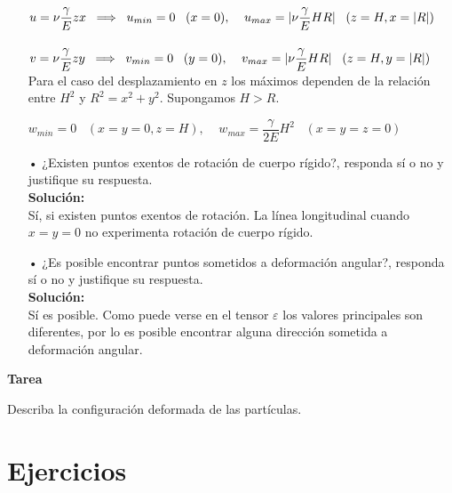 \documentclass[../notas medios.tex]{subfiles}
\begin{document}
\begin{enumerate}
$u =  \nu \dfrac{\gamma}{E} zx  \;\; \Longrightarrow  \;\; u_{min} = 0  \;\;\; (x=0),  \;\;\;\;  u_{max} =\lvert \nu \dfrac{\gamma}{E} HR\rvert \;\;\; (z=H, x=\lvert R\rvert)$ \\\\
$v =  \nu \dfrac{\gamma}{E} zy  \;\; \Longrightarrow  \;\; v_{min} = 0  \;\;\; (y=0),  \;\;\;\;  v_{max} =\lvert \nu \dfrac{\gamma}{E} HR\rvert \;\;\; (z=H, y=\lvert R\rvert)$ \\

	Para el caso del desplazamiento en $z$ los máximos dependen de la relación entre $H^2$ y $R^2=x^2 + y^2$. Supongamos $H>R$. 
	

$w_{min} = 0  \;\;\; ( x=y=0,z=H),  \;\;\;\;  w_{max} = \dfrac{\gamma}{2E} H^2  \;\;\; ( x=y=z=0)$ \\


	\item[•]¿Existen puntos exentos de rotaci\'on de cuerpo r\'igido?, responda s\'i o no y justifique su respuesta.\\
	
	\textbf{Solución:}\\
	
	Sí, si existen puntos exentos de rotación. La línea longitudinal cuando $x=y=0$ no experimenta rotación de cuerpo rígido. 
	 
	\item[•]¿Es posible encontrar puntos sometidos a deformación angular?, responda s\'i o no y justifique su respuesta. \\
	
		\textbf{Solución:}\\
		
		Sí es posible. Como puede verse en el tensor  $\varepsilon$ los valores principales son diferentes, por lo es posible encontrar alguna dirección sometida a deformación angular.
%
\end{enumerate}

\textbf{Tarea}

Describa la configuración deformada de las partículas. 


\section{Ejercicios}
\end{document}
